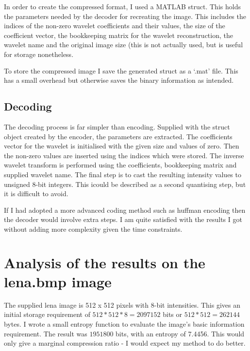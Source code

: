 \documentclass[a4paper]{article}
\begin{document}
In order to create the compressed format, I used a MATLAB struct. This holds the parameters needed by the decoder for recreating the image. This includes the indices of the non-zero wavelet coefficients and their values, the size of the coefficient vector, the bookkeeping matrix for the wavelet reconstruction, the wavelet name and the original image size (this is not actually used, but is useful for storage nonetheless.

To store the compressed image I save the generated struct as a `.mat' file. This has a small overhead but otherwise saves the binary information as intended.

\subsection{Decoding}
The decoding process is far simpler than encoding. Supplied with the struct object created by the encoder, the parameters are extracted. The coefficients vector for the wavelet is initialised with the given size and values of zero. Then the non-zero values are inserted using the indices which were stored. The inverse wavelet transform is performed using the coefficients, bookkeeping matrix and supplied wavelet name. The final step is to cast the resulting intensity values to unsigned 8-bit integers. This icould be described as a second quantising step, but it is difficult to avoid.

If I had adopted a more advanced coding method such as huffman encoding then the decoder would involve extra steps. I am quite satisfied with the results I got without adding more complexity given the time constraints.
 

\section{Analysis of the results on the lena.bmp image}
The supplied lena image is 512 x 512 pixels with 8-bit intensities. This gives an initial storage requirement of $512 * 512 * 8 = 2097152$ bits or $512 *512 = 262144$ bytes.
I wrote a small entropy function to evaluate the image's basic information requirement. The result was $1951800$ bits, with an entropy of 7.4456. This would only give a marginal compression ratio - I would expect my method to do better.
\end{document}
